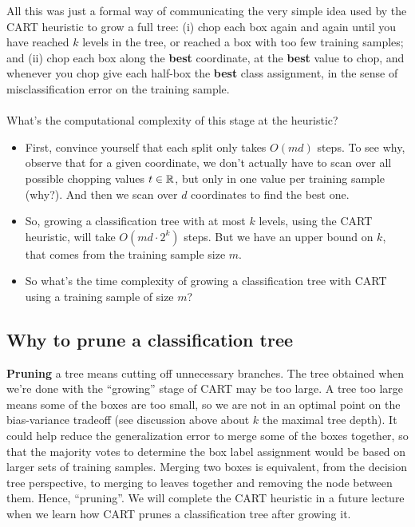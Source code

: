 \documentclass[11pt]{article}
\begin{document}
All this was just a formal way of communicating the very simple idea used by
the CART heuristic to grow a full tree: (i) chop each box again and again until
you have reached $k$ levels in the tree, or reached a box with too few training
samples; and (ii) chop each box along the {\bf best}
coordinate, at the {\bf best} value to chop, and whenever you chop give each
half-box the {\bf best} class assignment, in the sense of misclassification
error on the training sample. 
\\~\\
What's the computational complexity of this stage at the heuristic?
\begin{itemize}
  \item First, convince
yourself that each split only takes $O(md)$ steps. To see why, observe that for a given coordinate,
we don't actually have to scan over all possible chopping values $t\in\mathbb{R}$,
but only in one value per training sample (why?). And then we scan over $d$
coordinates to find the best one. 
\item So, growing a classification tree with at most $k$ levels, using the CART
  heuristic, will take $O(md\cdot 2^k)$ steps. But we have an upper bound on
  $k$, that comes from the training sample size $m$. 
\item So what's the time complexity of growing a classification tree with CART
  using a training sample of size $m$?
\end{itemize}



\subsection{Why to prune a classification tree}

{\bf Pruning} a tree means cutting off unnecessary branches. The tree obtained
when we're done with the ``growing'' stage of CART may be too large. A tree too
large means some of the boxes are too small, so we are not in an optimal point
on the bias-variance tradeoff (see discussion above about $k$ the maximal tree
depth). It could help reduce the generalization error to merge some of the boxes
together, so that the majority votes to determine the box label assignment 
would be based on larger sets of training
samples. Merging two boxes is equivalent, from the decision tree perspective, to
merging to leaves together and removing the node between them. Hence,
``pruning''. We will complete the CART heuristic in a future lecture when we
learn how CART prunes a classification tree after growing it.
\end{document}
